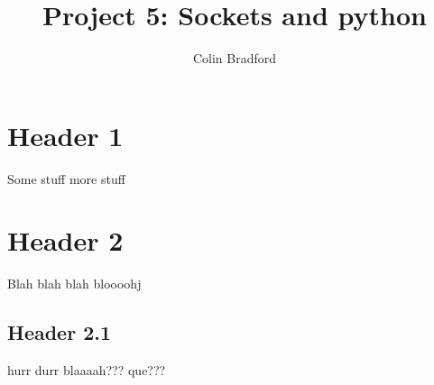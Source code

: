 \documentclass[11pt, oneside]{article}   	%
\title{Project 5: Sockets and python}
\author{Colin Bradford}
\begin{document}
\maketitle

	\section{Header 1}
	Some stuff
	more stuff
	\section{Header 2}
	Blah blah blah
	bloooohj
	\subsection{Header 2.1}
	hurr durr blaaaah???
	que???
%
\end{document}
